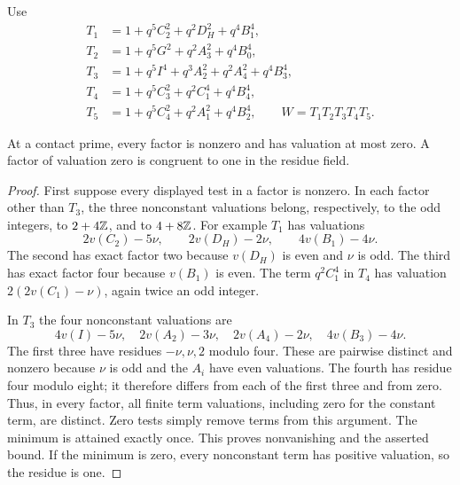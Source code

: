 \documentclass[11pt,a4paper]{article}
\begin{document}
Use
\begin{align*}
 T_1&=1+q^5C_2^2+q^2D_H^2+q^4B_1^4,\\
 T_2&=1+q^5G^2+q^2A_3^2+q^4B_0^4,\\
 T_3&=1+q^5I^4+q^3A_2^2+q^2A_4^2+q^4B_3^4,\\
 T_4&=1+q^5C_3^2+q^2C_1^4+q^4B_4^4,\\
 T_5&=1+q^5C_4^2+q^2A_1^2+q^4B_2^4,
 \qquad W=T_1T_2T_3T_4T_5.
\end{align*}

\begin{lemma}\label{lem:residues}
At a contact prime, every factor is nonzero and has valuation at most
zero. A factor of valuation zero is congruent to one in the residue field.
\end{lemma}
\begin{proof}
First suppose every displayed test in a factor is nonzero. In each
factor other than $T_3$, the three nonconstant valuations belong,
respectively, to the odd integers, to $2+4\mathbb Z$, and to $4+8\mathbb Z$.
For example $T_1$ has valuations
\[
 2v(C_2)-5\nu,\qquad 2v(D_H)-2\nu,\qquad4v(B_1)-4\nu.
\]
The second has exact factor two because $v(D_H)$ is even and $\nu$ is
odd. The third has exact factor four because $v(B_1)$ is even.
The term $q^2C_1^4$ in $T_4$ has valuation
$2(2v(C_1)-\nu)$, again twice an odd integer.

In $T_3$ the four nonconstant valuations are
\[
 4v(I)-5\nu,\quad 2v(A_2)-3\nu,\quad
 2v(A_4)-2\nu,\quad4v(B_3)-4\nu.
\]
The first three have residues $-\nu,\nu,2$ modulo four. These are
pairwise distinct and nonzero because $\nu$ is odd and the $A_i$
have even valuations. The fourth has residue four modulo eight;
it therefore differs from each of the first three and from zero.
Thus, in every factor, all finite term valuations, including zero
for the constant term, are distinct. Zero tests simply remove terms
from this argument. The minimum is attained exactly once. This proves
nonvanishing and the asserted bound. If the minimum is zero, every
nonconstant term has positive valuation, so the residue is one.
\end{proof}
\end{document}

